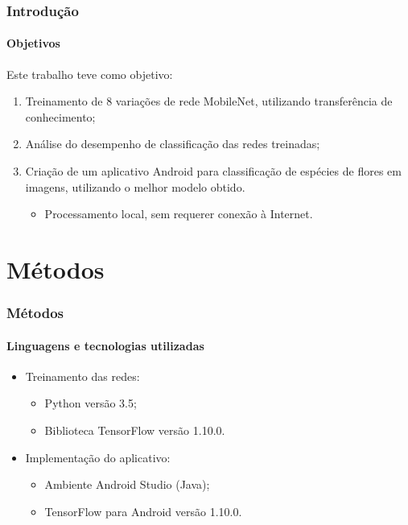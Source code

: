 \documentclass{beamer}
\begin{document}
    \begin{frame}
      \frametitle{Introdução}
      \framesubtitle{Objetivos}
      Este trabalho teve como objetivo:\medskip
      \begin{enumerate}        
        \item<1-> Treinamento de 8 variações de rede MobileNet, utilizando transferência de conhecimento;        
        \medskip 
        \item<2-> Análise do desempenho de classificação das redes treinadas;       
        \medskip        
        \item<3-> Criação de um aplicativo Android para classificação de espécies de flores em imagens, utilizando o melhor modelo obtido.
        \begin{itemize}
        		\item<3-> Processamento local, sem requerer conexão à Internet.
        \end{itemize}
        \medskip
      \end{enumerate}
    \end{frame}
    
    \section{Métodos} %
    \begin{frame}
      \frametitle{Métodos}
      \framesubtitle{Linguagens e tecnologias utilizadas}      
	  \begin{itemize}
        \item<1-> Treinamento das redes: \medskip
	    		\begin{itemize}
	    			\item<1-> Python versão 3.5;\medskip
	    			\item<1-> Biblioteca TensorFlow versão 1.10.0.\medskip
	    		\end{itemize}  
      \end{itemize}	
      \begin{itemize}
        \item<2-> Implementação do aplicativo: \medskip
	    		\begin{itemize}
	    			\item<2-> Ambiente Android Studio (Java); \medskip
	    			\item<2-> TensorFlow para Android versão 1.10.0. \medskip	    			
	    		\end{itemize}  
      \end{itemize}			      
    \end{frame}
        
\end{document}
